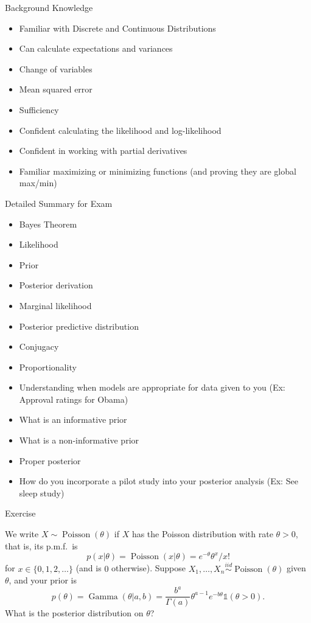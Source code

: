 \documentclass[
  ignorenonframetext,
]{beamer}
\providecommand{\tightlist}{%
  \setlength{\itemsep}{0pt}\setlength{\parskip}{0pt}}
\DeclareMathOperator*{\Ga}{Gamma}
\DeclareMathOperator*{\Poisson}{Poisson}
\newcommand{\I}{\mathds{1}}
\begin{document}
\begin{frame}{Background Knowledge}
\protect\hypertarget{background-knowledge}{}

\begin{itemize}
\tightlist
\item
  Familiar with Discrete and Continuous Distributions
\item
  Can calculate expectations and variances
\item
  Change of variables
\item
  Mean squared error
\item
  Sufficiency
\item
  Confident calculating the likelihood and log-likelihood
\item
  Confident in working with partial derivatives
\item
  Familiar maximizing or minimizing functions (and proving they are
  global max/min)
\end{itemize}

\end{frame}

\begin{frame}{Detailed Summary for Exam}
\protect\hypertarget{detailed-summary-for-exam}{}

\begin{itemize}
\tightlist
\item
  Bayes Theorem
\item
  Likelihood
\item
  Prior
\item
  Posterior derivation
\item
  Marginal likelihood
\item
  Posterior predictive distribution
\item
  Conjugacy
\item
  Proportionality
\item
  Understanding when models are appropriate for data given to you (Ex:
  Approval ratings for Obama)
\item
  What is an informative prior
\item
  What is a non-informative prior
\item
  Proper posterior
\item
  How do you incorporate a pilot study into your posterior analysis (Ex:
  See sleep study)
\end{itemize}

\end{frame}

\begin{frame}{Exercise}
\protect\hypertarget{exercise}{}

We write \(X\sim\Poisson(\theta)\) if \(X\) has the Poisson distribution
with rate \(\theta>0\), that is, its p.m.f.~is
\[ p(x|\theta) = \Poisson(x|\theta)= e^{-\theta} \theta^x / x!\] for
\(x\in\{0,1,2,\dotsc\}\) (and is \(0\) otherwise). Suppose
\(X_1,\dotsc,X_n \stackrel{iid}{\sim} \Poisson(\theta)\) given
\(\theta\), and your prior is
\[ p(\theta) =\Ga(\theta|a,b) =\frac{b^a}{\Gamma(a)} \theta^{a-1} e^{-b\theta}\I(\theta>0) .\]
What is the posterior distribution on \(\theta\)?

\end{frame}
\end{document}
